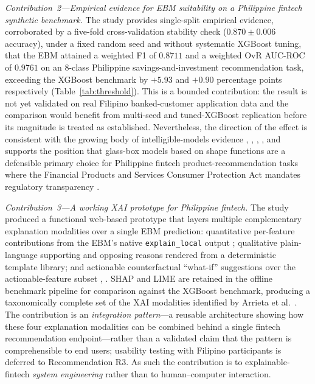 \documentclass[journal]{./IEEE/IEEEtran}
\begin{document}
\textit{Contribution~2---Empirical evidence for EBM suitability on a Philippine fintech synthetic benchmark.} The study provides single-split empirical evidence, corroborated by a five-fold cross-validation stability check ($0.870 \pm 0.006$ accuracy), under a fixed random seed and without systematic XGBoost tuning, that the EBM attained a weighted F1 of $0.8711$ and a weighted OvR AUC-ROC of $0.9761$ on an 8-class Philippine savings-and-investment recommendation task, exceeding the XGBoost benchmark by $+5.93$ and $+0.90$ percentage points respectively (Table~\ref{tab:threshold}). This is a bounded contribution: the result is not yet validated on real Filipino banked-customer application data and the comparison would benefit from multi-seed and tuned-XGBoost replication \cite{ref68} before its magnitude is treated as established. Nevertheless, the direction of the effect is consistent with the growing body of intelligible-models evidence \cite{ref15}, \cite{ref48}, \cite{ref49}, \cite{ref50}, and supports the position that glass-box models based on shape functions are a defensible primary choice for Philippine fintech product-recommendation tasks where the Financial Products and Services Consumer Protection Act \cite{ref44} mandates regulatory transparency \cite{ref51}.

\textit{Contribution~3---A working XAI prototype for Philippine fintech.} The study produced a functional web-based prototype that layers multiple complementary explanation modalities over a single EBM prediction: quantitative per-feature contributions from the EBM's native \texttt{explain\_local} output \cite{ref15}; qualitative plain-language supporting and opposing reasons rendered from a deterministic template library; and actionable counterfactual ``what-if'' suggestions over the actionable-feature subset \cite{ref20}, \cite{ref86}. SHAP \cite{ref18} and LIME \cite{ref19} are retained in the offline benchmark pipeline for comparison against the XGBoost benchmark, producing a taxonomically complete set of the XAI modalities identified by Arrieta et al.\ \cite{ref17}. The contribution is an \emph{integration pattern}---a reusable architecture showing how these four explanation modalities can be combined behind a single fintech recommendation endpoint---rather than a validated claim that the pattern is comprehensible to end users; usability testing with Filipino participants is deferred to Recommendation R3. As such the contribution is to explainable-fintech \emph{system engineering} rather than to human--computer interaction.
\end{document}
